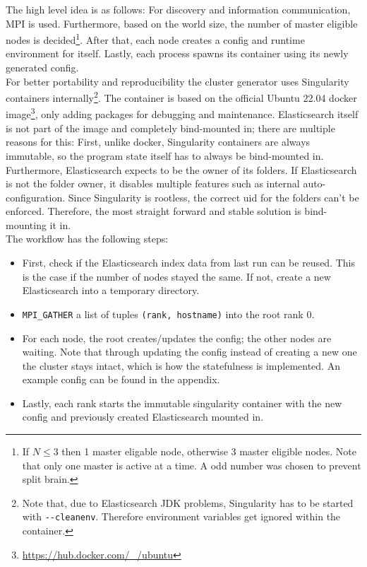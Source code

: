 The high level idea is as follows: For discovery and information communication, \ac{MPI} is used. Furthermore, based on the world size, the number of master eligible nodes is decided\footnote{If $N \leq 3$ then 1 master eligable node, otherwise 3 master eligible nodes. Note that only one master is active at a time. A odd number was chosen to prevent split brain.}. After that, each node creates a config and runtime environment for itself. Lastly, each process spawns its container using its newly generated config.\\

For better portability and reproducibility the cluster generator uses Singularity containers internally\footnote{Note that, due to Elasticsearch JDK problems, Singularity has to be started with \texttt{-{}-cleanenv}. Therefore environment variables get ignored within the container.}. The container is based on the official Ubuntu 22.04 docker image\footnote{\url{https://hub.docker.com/_/ubuntu}}, only adding packages for debugging and maintenance. Elasticsearch itself is not part of the image and completely bind-mounted in; there are multiple reasons for this: First, unlike docker, Singularity containers are always immutable, so the program state itself has to always be bind-mounted in. Furthermore, Elasticsearch expects to be the owner of its folders. If Elasticsearch is not the folder owner, it disables multiple features such as internal auto-configuration. Since Singularity is rootless, the correct uid for the folders can't be enforced. Therefore, the most straight forward and stable solution is bind-mounting it in.\\

The workflow has the following steps:
\begin{itemize}
  \item First, check if the Elasticsearch index data from last run can be reused. This is the case if the number of nodes stayed the same. If not, create a new Elasticsearch into a temporary directory.
  \item \texttt{MPI\_GATHER} a list of tuples \texttt{(rank, hostname)} into the root rank 0.
  \item For each node, the root creates/updates the config; the other nodes are waiting. Note that through updating the config instead of creating a new one the cluster stays intact, which is how the statefulness is implemented. An example config can be found in the appendix.
  \item Lastly, each rank starts the immutable singularity container with the new config and previously created Elasticsearch mounted in.
\end{itemize}

